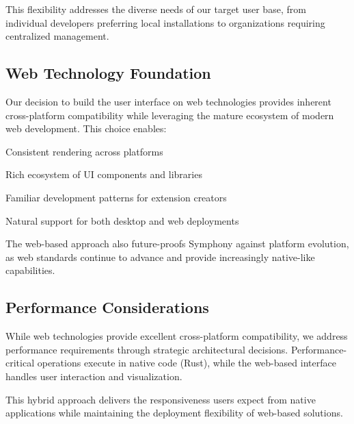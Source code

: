 This flexibility addresses the diverse needs of our target user base, from individual developers preferring local installations to organizations requiring centralized management.

\subsection*{Web Technology Foundation}

Our decision to build the user interface on web technologies provides inherent cross-platform compatibility while leveraging the mature ecosystem of modern web development. This choice enables:

\begin{infobox}[title=Web Technology Benefits]
\begin{compactlist}
    \item Consistent rendering across platforms
    \item Rich ecosystem of UI components and libraries
    \item Familiar development patterns for extension creators
    \item Natural support for both desktop and web deployments
\end{compactlist}
\end{infobox}

The web-based approach also future-proofs Symphony against platform evolution, as web standards continue to advance and provide increasingly native-like capabilities.

\subsection*{Performance Considerations}

While web technologies provide excellent cross-platform compatibility, we address performance requirements through strategic architectural decisions. Performance-critical operations execute in native code (Rust), while the web-based interface handles user interaction and visualization.

\begin{alertbox}
This hybrid approach delivers the responsiveness users expect from native applications while maintaining the deployment flexibility of web-based solutions.
\end{alertbox}
